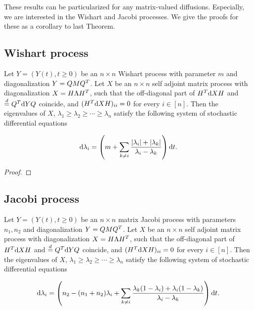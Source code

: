 These results can be particularized for any matrix-valued diffusions. Especially, we are interested in the Wishart and Jacobi processes. We give the proofs for these as a corollary to last Theorem.

\subsection{Wishart process}

\begin{corollary}
    Let $Y = (Y(t), t \ge 0)$ be an $n\times n$ Wishart process with parameter $m$ and diagonalization $Y = QMQ^T$. Let $X$ be an $n\times n$ self adjoint matrix process with diagonalization $X = H \Lambda H^T$, such that the off-diagonal part of $H^T \mathrm d X H $ and $\overset{d}{=} Q^T \mathrm d Y Q$ coincide, and $(H^T \mathrm d X H)_{ii} = 0$ for every $i \in [n]$. Then the eigenvalues of $X$, $\lambda_1 \ge \lambda_2 \ge \cdots \ge \lambda_n$ satisfy the following system of stochastic differential equations

    \begin{equation*}
        \mathrm d \lambda_i = \left( m +\sum_{k\neq i} \frac{ \lvert \lambda_i \rvert + \lvert \lambda_k \rvert }{\lambda_i - \lambda_k}\right)\mathrm d t.
    \end{equation*}
\end{corollary}

\begin{proof}
    
\end{proof}


\subsection{Jacobi process}

\begin{corollary}
    Let $Y = (Y(t), t \ge 0)$ be an $n\times n$ matrix Jacobi process with parameters $n_1,n_2$ and diagonalization $Y = QMQ^T$. Let $X$ be an $n\times n$ self adjoint matrix process with diagonalization $X = H \Lambda H^T$, such that the off-diagonal part of $H^T \mathrm d X H $ and $\overset{d}{=} Q^T \mathrm d Y Q$ coincide, and $(H^T \mathrm d X H)_{ii} = 0$ for every $i \in [n]$. Then the eigenvalues of $X$, $\lambda_1 \ge \lambda_2 \ge \cdots \ge \lambda_n$ satisfy the following system of stochastic differential equations

    \begin{equation} \label{eq:deterministic_jacobi}
        \mathrm d \lambda_i = \left( n_2 - (n_1 + n_2)\lambda_i + \sum_{k\neq i} \frac{\lambda_k(1-\lambda_i) + \lambda_i(1-\lambda_k)}{\lambda_i - \lambda_k} \right)\mathrm d t.
    \end{equation}

\end{corollary}


